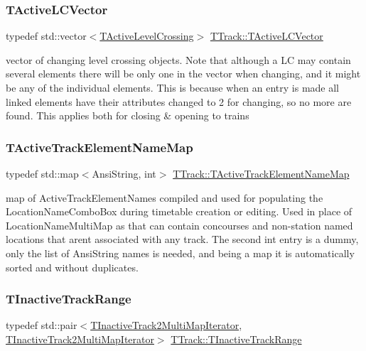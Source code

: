 \subsubsection{\texorpdfstring{T\+Active\+L\+C\+Vector}{TActiveLCVector}}
{\footnotesize\ttfamily typedef std\+::vector$<$\mbox{\hyperlink{class_t_track_1_1_t_active_level_crossing}{T\+Active\+Level\+Crossing}}$>$ \mbox{\hyperlink{class_t_track_af124e944cfb44075f390cf5eceaf3e66}{T\+Track\+::\+T\+Active\+L\+C\+Vector}}}

vector of changing level crossing objects. Note that although a LC may contain several elements there will be only one in the vector when changing, and it might be any of the individual elements. This is because when an entry is made all linked elements have their attributes changed to 2 for changing, so no more are found. This applies both for closing \& opening to trains \mbox{\label{class_t_track_af78e1d88c49cebd05b35fc408a5d9d2e}} 
\subsubsection{\texorpdfstring{T\+Active\+Track\+Element\+Name\+Map}{TActiveTrackElementNameMap}}
{\footnotesize\ttfamily typedef std\+::map$<$Ansi\+String, int$>$ \mbox{\hyperlink{class_t_track_af78e1d88c49cebd05b35fc408a5d9d2e}{T\+Track\+::\+T\+Active\+Track\+Element\+Name\+Map}}}

map of Active\+Track\+Element\+Names compiled and used for populating the Location\+Name\+Combo\+Box during timetable creation or editing. Used in place of Location\+Name\+Multi\+Map as that can contain concourses and non-\/station named locations that aren\textquotesingle{}t associated with any track. The second \textquotesingle{}int\textquotesingle{} entry is a dummy, only the list of Ansi\+String names is needed, and being a map it is automatically sorted and without duplicates. \mbox{\label{class_t_track_a1ac6dda244b2f5a6e27a458f28fc1b1c}} 
\subsubsection{\texorpdfstring{T\+Inactive\+Track\+Range}{TInactiveTrackRange}}
{\footnotesize\ttfamily typedef std\+::pair$<$\mbox{\hyperlink{class_t_track_a6072881896a545945cbcc26e8307bb68}{T\+Inactive\+Track2\+Multi\+Map\+Iterator}}, \mbox{\hyperlink{class_t_track_a6072881896a545945cbcc26e8307bb68}{T\+Inactive\+Track2\+Multi\+Map\+Iterator}}$>$ \mbox{\hyperlink{class_t_track_a1ac6dda244b2f5a6e27a458f28fc1b1c}{T\+Track\+::\+T\+Inactive\+Track\+Range}}}

